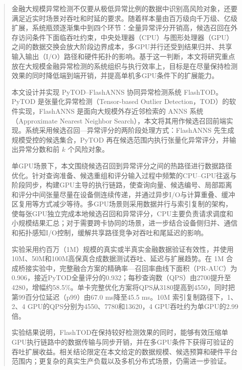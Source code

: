 

\begin{abstract}
金融大规模异常检测不仅要从极低异常比例的数据中识别高风险对象，还要满足近实时场景对吞吐和时延的要求。随着样本量由百万级向千万级、亿级扩展，系统瓶颈逐渐集中到四个环节：全量异常评分开销高，候选召回在外存访问条件下面临吞吐约束，中央处理器（CPU）与图形处理器（GPU）之间的数据交换会放大阶段边界成本，多GPU并行还受到结果归并、共享输入输出（I/O）路径和硬件拓扑的影响。基于这一判断，本文将研究重点放在大规模金融异常检测的系统组织与执行效率上，目标是在尽量保持检测效果的同时降低端到端开销，并提高单机多GPU条件下的扩展能力。

本文设计并实现 PyTOD--FlashANNS 协同异常检测系统 FlashTOD。PyTOD 是张量化异常检测（Tensor-based Outlier Detection，TOD）的软件实现，FlashANNS 是面向大规模外存近邻检索的 ANNS 系统（Approximate Nearest Neighbor Search），本文将其用作候选召回前端实现。系统采用候选召回—异常评分的两阶段处理方式：FlashANNS 先生成规模受控的候选集合，PyTOD 再在候选范围内执行张量化异常评分，并输出异常分数和前 $k$ 个风险对象。

单GPU场景下，本文围绕候选召回到异常评分之间的热路径进行数据路径优化。针对查询准备、候选重组和评分输入过程中频繁的CPU–GPU往返与阶段同步，构建GPU主导的执行链路，使查询向量、候选编号、局部距离和评分中间张量尽量在设备侧连续传递，并通过异步I/O与计算重叠、缓冲区复用等方式减少等待。多GPU场景则采用数据并行与索引复制的架构，使每张GPU独立完成本地候选召回和异常评分，CPU主要负责请求调度和小规模结果汇总；对于需要跨卡协同的场景，进一步结合设备侧归并、通信和拓扑感知I/O控制，缓解共享路径竞争对吞吐和尾延迟的影响。

实验采用约百万（1M）规模的真实或半真实金融数据验证有效性，并使用10M、50M和100M高保真合成数据测试吞吐、延迟与扩展趋势。在 1M 合成桥接实验中，完整融合方案的精确率—召回率曲线下面积（PR-AUC）为0.906，接近PyTOD全量评分的0.932；每秒查询数（QPS）由2700提升至4280，增幅约58.5\%。单卡完整优化方案将QPS从3180提高到4550，同时把第99百分位延迟（p99）由67.0 ms降至45.5 ms。10M 索引复制路径下，1、2、4 GPU的QPS分别为4550、7780和13620，4 GPU吞吐约为单GPU的2.99倍。

实验结果说明，FlashTOD在保持较好检测效果的同时，能够有效压缩单GPU执行链路中的数据传输与同步开销，并在多GPU条件下获得可验证的吞吐扩展收益。相关结论限定在本文给定的数据规模、候选预算和硬件平台范围内；更复杂的真实生产负载以及多机分布式场景，仍需进一步验证。
\end{abstract}

